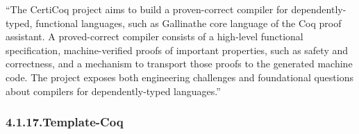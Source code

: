 \documentclass[12pt,twoside]{article}
\begin{document}
\noindent{}\textquotedblleft{}The CertiCoq project aims to build a proven-correct compiler for
dependently-typed, functional languages, such as Gallinathe core
language of the Coq proof assistant. A proved-correct compiler
consists of a high-level functional specification, machine-verified
proofs of important properties, such as safety and correctness, and a
mechanism to transport those proofs to the generated machine code. The
project exposes both engineering challenges and foundational questions
about compilers for dependently-typed languages.\textquotedblright{}%

\subsubsection{4.1.17.\hspace*{0.5em}Template-Coq}\label{sec-template-coq}%
\end{document}
